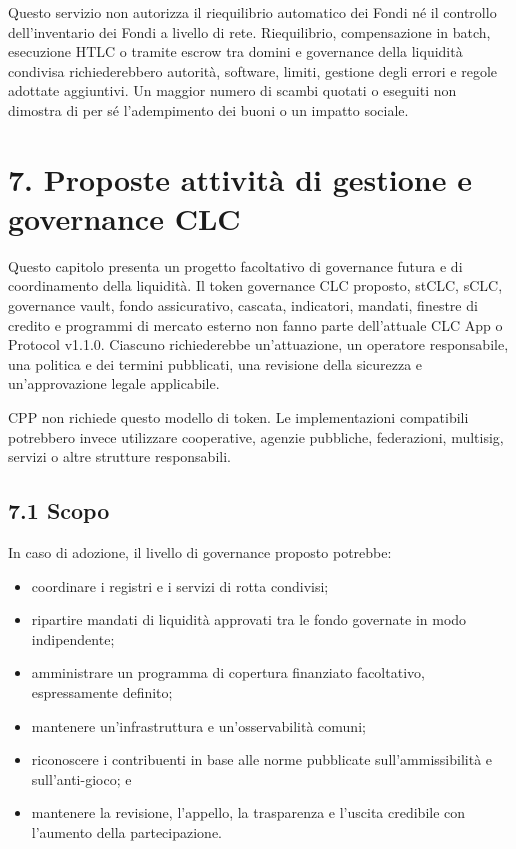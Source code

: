 \documentclass[11pt]{article}
\begin{document}
Questo servizio non autorizza il riequilibrio automatico dei Fondi né il controllo dell'inventario dei Fondi a livello di rete. Riequilibrio, compensazione in batch, esecuzione HTLC o tramite escrow tra domini e governance della liquidità condivisa richiederebbero autorità, software, limiti, gestione degli errori e regole adottate aggiuntivi. Un maggior numero di scambi quotati o eseguiti non dimostra di per sé l'adempimento dei buoni o un impatto sociale.


\section*{7. Proposte attività di gestione e governance CLC}

Questo capitolo presenta un progetto facoltativo di governance futura e di coordinamento della liquidità. Il token governance CLC proposto, stCLC, sCLC, governance vault, fondo assicurativo, cascata, indicatori, mandati, finestre di credito e programmi di mercato esterno non fanno parte dell'attuale CLC App o Protocol v1.1.0. Ciascuno richiederebbe un'attuazione, un operatore responsabile, una politica e dei termini pubblicati, una revisione della sicurezza e un'approvazione legale applicabile.

CPP non richiede questo modello di token. Le implementazioni compatibili potrebbero invece utilizzare cooperative, agenzie pubbliche, federazioni, multisig, servizi o altre strutture responsabili.

\subsection*{7.1 Scopo}

In caso di adozione, il livello di governance proposto potrebbe:

\begin{itemize}[leftmargin=*]
\item coordinare i registri e i servizi di rotta condivisi;
\item ripartire mandati di liquidità approvati tra le fondo governate in modo indipendente;
\item amministrare un programma di copertura finanziato facoltativo, espressamente definito;
\item mantenere un'infrastruttura e un'osservabilità comuni;
\item riconoscere i contribuenti in base alle norme pubblicate sull'ammissibilità e sull'anti-gioco; e
\item mantenere la revisione, l'appello, la trasparenza e l'uscita credibile con l'aumento della partecipazione.
\end{itemize}
\end{document}
